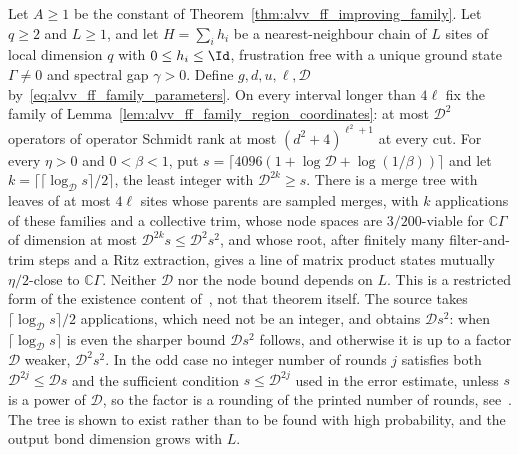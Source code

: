 \begin{lemma}
    \label{thm:alvv_unique_ground_state_tree}
    \leanok
    Let $A\ge1$ be the constant of Theorem~\ref{thm:alvv_ff_improving_family}.
    Let $q\ge2$ and $L\ge1$, and let $H=\sum_ih_i$ be a nearest-neighbour chain
    of $L$ sites of local dimension $q$ with $0\le h_i\le\Id$, frustration free
    with a unique ground state $\Gamma\ne0$ and spectral gap $\gamma>0$. Define
    $g,d,u,\ell,\mathcal D$ by~\eqref{eq:alvv_ff_family_parameters}. On every
    interval longer than $4\ell$ fix the family of
    Lemma~\ref{lem:alvv_ff_family_region_coordinates}: at most $\mathcal D^2$
    operators of operator Schmidt rank at most $(d^2+4)^{\ell^2+1}$ at every cut.
    For every $\eta>0$ and $0<\beta<1$, put
    $s=\lceil4096(1+\log\mathcal D+\log(1/\beta))\rceil$ and let
    $k=\lceil\lceil\log_{\mathcal D}s\rceil/2\rceil$, the least integer with
    $\mathcal D^{2k}\ge s$. There is a merge tree with leaves of at most $4\ell$
    sites whose parents are sampled merges, with $k$ applications of these
    families and a collective trim, whose node spaces are $3/200$-viable for
    $\mathbb C\Gamma$ of dimension at most
    $\mathcal D^{2k}s\le\mathcal D^2s^2$, and whose root, after finitely many
    filter-and-trim steps and a Ritz extraction, gives a line of matrix
    product states mutually $\eta/2$-close to $\mathbb C\Gamma$. Neither
    $\mathcal D$ nor the node bound depends on $L$. This is a restricted
    form of the existence content of~\cite[Theorem~\texttt{t:unique}, lines
        1829--1855]{Arad2016RigorousRG}, not that theorem itself. The source
    takes $\lceil\log_{\mathcal D}s\rceil/2$ applications, which need not be an
    integer, and obtains $\mathcal Ds^2$: when $\lceil\log_{\mathcal D}s\rceil$
    is even the sharper bound $\mathcal Ds^2$ follows, and otherwise
    it is up to a factor $\mathcal D$ weaker, $\mathcal D^2s^2$. In the odd
    case no integer number of rounds $j$ satisfies both
    $\mathcal D^{2j}\le\mathcal Ds$ and the sufficient condition $s\le\mathcal D^{2j}$ used in
    the error estimate, unless $s$ is a power of $\mathcal D$, so the factor is a
    rounding of the printed number of rounds,
    see~\cite{gap:alvv16_unique_ground_state_tree}. The tree is
    shown to exist rather than to be found with high probability, and the
    output bond dimension grows with $L$.
\end{lemma}
